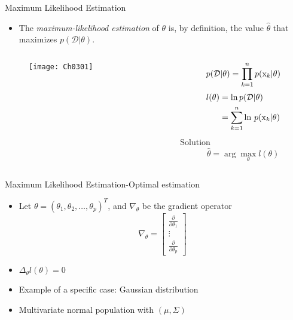 \begin{frame}{{Maximum Likelihood Estimation}}
\begin{itemize}
\item The \textit{\color{mycolor1}maximum-likelihood estimation} of $\theta$ is, by definition, the value $\hat{\theta}$ that maximizes $p(\mathcal{D}|\theta)$.
\end{itemize}
\vspace{-12pt}
\begin{columns}
\begin{column}{6cm}
\vspace{-12pt}
\begin{figure}
\texttt{[image: Ch0301]}
\end{figure}
\end{column}
\begin{column}{5cm}
\begin{equation}
p(\mathcal{D}| \theta ) = \prod\limits_{k = 1}^n {p({{\rm x}_k}|\theta )}\nonumber
\end{equation}
\begin{align}
l(\theta)&=\ln p(\mathcal{D}|\theta)\nonumber\\
&=\sum\limits_{k = 1}^n {{\mathop{\rm \ln } \nolimits}~p({{\rm x}_k}|\theta )}\nonumber
\end{align}
{\color{mycolor2}Solution}\\
\begin{equation}
\hat \theta  = \arg \mathop {\max }\limits_\theta  l(\theta )\nonumber
\end{equation}
\end{column}
\end{columns}
\end{frame}

\begin{frame}{Maximum Likelihood Estimation-Optimal estimation}
\begin{itemize}
\item Let $\theta=(\theta_1,\theta_2,\ldots,\theta_p)^T$, and $\nabla_{\theta}$ be the gradient operator
\begin{equation}
{\nabla _\theta } = \left[ {\begin{array}{*{20}{c}}
{\frac{\partial }{{\partial {\theta _1}}}}\\
 \vdots \\
{\frac{\partial }{{\partial {\theta _p}}}}
\end{array}} \right]\nonumber
\end{equation}
\item $\Delta_{\theta}l(\theta)=0$
\item {\color{mycolor1}Example of a specific case}: Gaussian distribution
\item Multivariate normal population with $(\mu,\Sigma)$
\end{itemize}
\end{frame}

